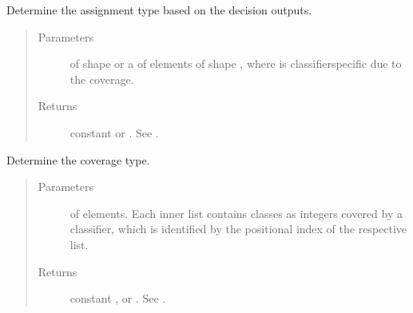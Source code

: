 \documentclass[letterpaper,10pt,english]{sphinxmanual}
\begin{document}
\begin{fulllineitems}
\label{\detokenize{pusion.auto.detector:pusion.auto.detector.determine_assignment_type}}
\sphinxAtStartPar
Determine the assignment type based on the decision outputs.
\begin{quote}\begin{description}
\item[{Parameters}] \leavevmode
\sphinxAtStartPar
{} \textendash{}  of shape  or a  of
 elements of shape , where  is classifier\sphinxhyphen{}specific
due to the coverage.

\item[{Returns}] \leavevmode
\sphinxAtStartPar
{} constant  or . See .

\end{description}\end{quote}

\end{fulllineitems}


\begin{fulllineitems}
\label{\detokenize{pusion.auto.detector:pusion.auto.detector.determine_coverage_type}}
\sphinxAtStartPar
Determine the coverage type.
\begin{quote}\begin{description}
\item[{Parameters}] \leavevmode
\sphinxAtStartPar
{} \textendash{}  of  elements. Each inner list contains classes as integers covered by a classifier,
which is identified by the positional index of the respective list.

\item[{Returns}] \leavevmode
\sphinxAtStartPar
{} constant ,   or .
See .

\end{description}\end{quote}

\end{fulllineitems}
\end{document}
